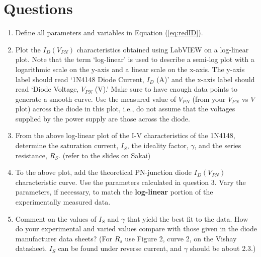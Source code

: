 \documentclass[12pt]{../manual}
\begin{document}
\newpage
\section{Questions}
\begin{enumerate}
\item Define all parameters and variables in Equation (\ref{eq:redID}).
\item Plot the $I_D(V_{PN})$ characteristics obtained using LabVIEW on a log-linear plot. Note that the term `log-linear' is used to describe a semi-log plot with a logarithmic scale on the y-axis and a linear scale on the x-axis. The y-axis label should read `1N4148 Diode Current, $I_D$ (A)' and the x-axis label should read `Diode Voltage, $V_{PN}$ (V).' Make sure to have enough data points to generate a smooth curve. Use the measured value of $V_{PN}$ (from your $V_{PN}$ vs $V$ plot) across the diode in this plot, i.e., do not assume that the voltages supplied by the power supply are those across the diode.
\item From the above log-linear plot of the I-V characteristics of the 1N4148, determine the saturation current, $I_S$, the ideality factor, $\gamma$, and the series resistance, $R_S$. (refer to the slides on Sakai)
\item To the above plot, add the theoretical PN-junction diode $I_D(V_{PN})$ characteristic curve. Use the parameters calculated in question 3. Vary the parameters, if necessary, to match the \textbf{log-linear} portion of the experimentally measured data.
\item Comment on the values of $I_S$ and $\gamma$ that yield the best fit to the data. How do your experimental and varied values compare with those given in the diode manufacturer data sheets? (For $R_s$ use Figure 2, curve 2, on the Vishay datasheet. $I_S$ can be found under reverse current, and $\gamma$ should be about 2.3.)
\end{enumerate}

\newpage
{} %
\end{document}
